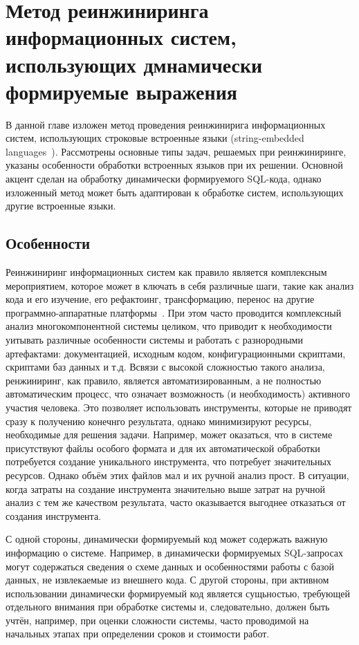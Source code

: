 \chapter{Метод реинжиниринга информационных систем, использующих дмнамически формируемые выражения}

В данной главе изложен метод проведения реинжинирига информационных систем, использующих строковые встроенные языки (string-embedded languages~\cite{Alvor1}). Рассмотрены основные типы задач, решаемых при реинжиниринге, указаны особенности обработки встроенных языков при их решении. Основной акцент сделан на обработку динамически формируемого SQL-кода, однако изложенный метод может быть адаптирован к обработке систем, использующих другие встроенные языки.

\section{Особенности}

Реинжиниринг информационных систем как правило является комплексным мероприятием, которое может в ключать в себя различные шаги, такие как анализ кода и его изучение, его рефактоинг, трансформацию, перенос на другие программно-аппаратные платформы~\cite{reengANT}. При этом часто проводится комплексный анализ многокомпонентной системы целиком, что приводит к необходимости уитывать различные особенности системы и работать с разнородными артефактами: документацией, исходным кодом, конфигурационными скриптами, скриптами баз данных и т.д. Всвязи с высокой сложностью такого анализа, ренжиниринг, как правило, является автоматизированным, а не полностью автоматическим процесс, что означает возможность (и необходимость) активного участия человека. Это позволяет использовать инструменты, которые не приводят сразу к получению конечнго результата, однако минимизируют ресурсы, необходимые для решения задачи. Например, может оказаться, что в системе присутствуют файлы особого формата и для их автоматической обработки потребуется создание уникального инструмента, что потребует значительных ресурсов. Однако объём этих файлов мал и их ручной анализ прост. В ситуации, когда затраты на создание инструмента значительно выше затрат на ручной анализ с тем же качеством результата, часто оказывается выгоднее отказаться от создания инструмента.

С одной стороны, динамически формируемый код может содержать важную информацию о системе. Например, в динамически формируемых SQL-запросах могут содержаться сведения о схеме данных и особенностями работы с базой данных, не извлекаемые из внешнего кода. С другой стороны, при активном использовании динамически формируемый код является сущьностью, требующей отдельного внимания при обработке системы и, следовательно, должен быть учтён, например, при оценки сложности системы, часто проводимой на начальных этапах при определении сроков и стоимости работ.

